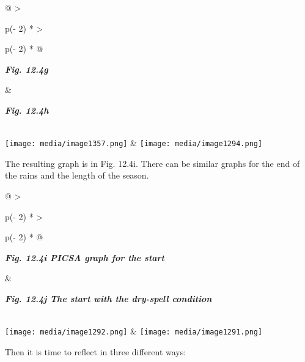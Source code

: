 \documentclass[
  letterpaper,
  DIV=11,
  numbers=noendperiod]{scrreprt}
\begin{document}
\begin{longtable}[]{@{}
  >{\raggedright\arraybackslash}p{(\columnwidth - 2\tabcolsep) * }
  >{\raggedright\arraybackslash}p{(\columnwidth - 2\tabcolsep) * }@{}}
\toprule\noalign{}
\begin{minipage}[b]{\linewidth}\raggedright
\textbf{\emph{Fig. 12.4g}}
\end{minipage} & \begin{minipage}[b]{\linewidth}\raggedright
\textbf{\emph{Fig. 12.4h}}
\end{minipage} \\
\midrule\noalign{}
\endhead
\bottomrule\noalign{}
\endlastfoot
\texttt{[image: media/image1357.png]}
&
\texttt{[image: media/image1294.png]} \\
\end{longtable}

The resulting graph is in Fig. 12.4i. There can be similar graphs for
the end of the rains and the length of the season.

\begin{longtable}[]{@{}
  >{\raggedright\arraybackslash}p{(\columnwidth - 2\tabcolsep) * }
  >{\raggedright\arraybackslash}p{(\columnwidth - 2\tabcolsep) * }@{}}
\toprule\noalign{}
\begin{minipage}[b]{\linewidth}\raggedright
\textbf{\emph{Fig. 12.4i PICSA graph for the start}}
\end{minipage} & \begin{minipage}[b]{\linewidth}\raggedright
\textbf{\emph{Fig. 12.4j The start with the dry-spell condition}}
\end{minipage} \\
\midrule\noalign{}
\endhead
\bottomrule\noalign{}
\endlastfoot
\texttt{[image: media/image1292.png]}
&
\texttt{[image: media/image1291.png]} \\
\end{longtable}

Then it is time to reflect in three different ways:
\end{document}
